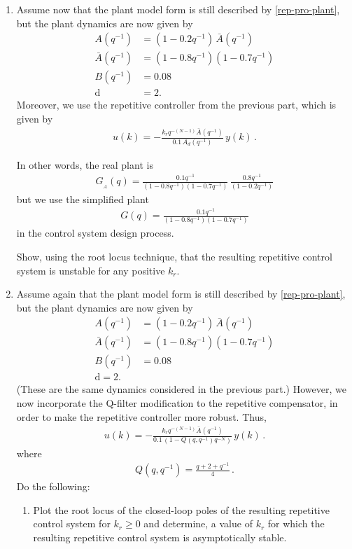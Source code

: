 \begin{enumerate}
    \item
    Assume now that the plant model form is still described by \eqref{rep-pro-plant}, but
    the plant dynamics are now given by
    \begin{align*}
        A(q^{-1}) & = (1 - 0.2 q^{-1}) \, \bar{A}(q^{-1}) \\
        \bar{A}(q^{-1}) & = (1 - 0.8 q^{-1})(1 - 0.7 q^{-1}) \\
        B(q^{-1}) & = 0.08 \\
        \textrm{d} & = 2.
    \end{align*}
    Moreover, we use the repetitive controller from the previous part, which is given by
    \begin{align*}
        u(k) = - \frac{k_r q^{-(N-1)} \bar{A}(q^{-1})}{0.1\,A_d(q^{-1}) }\, y(k)\,.
    \end{align*}

    In other words, the real plant is
    \begin{align*}
        G_{_A}(q) = \frac{0.1 q^{-1}}{(1 - 0.8 q^{-1})(1 - 0.7 q^{-1}) }\, \frac{0.8 q^{-1}}{(1 - 0.2 q^{-1})}
    \end{align*}
    but we use the simplified plant
    \begin{align*}
        G(q) = \frac{0.1 q^{-1} }{(1 - 0.8 q^{-1})(1 - 0.7 q^{-1})}
    \end{align*}
    in the control system design process.

    Show, using the root locus technique, that the resulting repetitive control system is unstable for any positive $k_r$.

    \item
    Assume again that the plant model form is still described by \eqref{rep-pro-plant}, but
    the plant dynamics are now given by
    \begin{align*}
        A(q^{-1}) & = (1 - 0.2 q^{-1}) \, \bar{A}(q^{-1}) \\
        \bar{A}(q^{-1}) & = (1 - 0.8 q^{-1})(1 - 0.7 q^{-1}) \\
        B(q^{-1}) & = 0.08 \\
        \textrm{d} = 2.
    \end{align*}
    (These are the same dynamics considered in the previous part.) However, we now incorporate the Q-filter modification to the repetitive compensator, in order to make the repetitive controller more robust. Thus,
    \begin{align*}
        u(k) = - \frac{k_r q^{-(N-1)} \bar{A}(q^{-1})}{ 0.1\, (1 - Q(q,q^{-1})q^{-N})}\, y(k)\,.
    \end{align*}
    where
    \begin{align*}
        Q(q,q^{-1}) = \frac{q + 2 + q^{-1}}{4}\,.
    \end{align*}
    Do the following:
    \begin{enumerate}
        \item
        Plot the root locus of the closed-loop poles of the resulting repetitive control system for $k_r \geq 0$ and determine,  a value of $k_r$ for which  the resulting repetitive control system is asymptotically stable.


\end{enumerate}
\end{enumerate}
